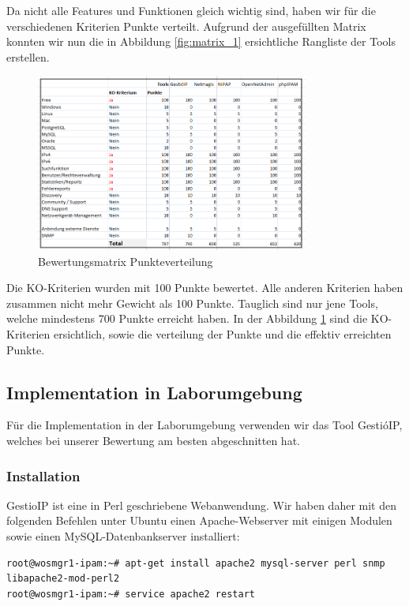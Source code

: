 \documentclass[11pt,a4paper,parskip=half]{scrartcl}
\begin{document}
Da nicht alle Features und Funktionen gleich wichtig sind, haben wir für die verschiedenen Kriterien Punkte verteilt. Aufgrund der ausgefüllten Matrix konnten wir nun die in Abbildung \ref{fig:matrix_1} ersichtliche Rangliste der Tools erstellen.
\begin{figure}[H]
\centering
\includegraphics[width=0.8\textwidth]{Phase3/Matrix_2.png}
\caption{Bewertungsmatrix Punkteverteilung}
\label{fig:matrix_2}
\end{figure}

Die KO-Kriterien wurden mit 100 Punkte bewertet. Alle anderen Kriterien haben zusammen nicht mehr Gewicht als 100 Punkte. Tauglich sind nur jene Tools, welche mindestens 700 Punkte erreicht haben. In der Abbildung  \ref{fig:matrix_2} sind die KO-Kriterien ersichtlich, sowie die verteilung der Punkte und die effektiv erreichten Punkte.
\subsection{Implementation in Laborumgebung}
Für die Implementation in der Laborumgebung verwenden wir das Tool GestióIP, welches bei unserer Bewertung am besten abgeschnitten hat.

\subsubsection{Installation}
GestioIP ist eine in Perl geschriebene Webanwendung. Wir haben daher mit den folgenden Befehlen unter Ubuntu einen Apache-Webserver mit einigen Modulen sowie einen MySQL-Datenbankserver installiert:

\begin{lstlisting}
root@wosmgr1-ipam:~# apt-get install apache2 mysql-server perl snmp libapache2-mod-perl2
root@wosmgr1-ipam:~# service apache2 restart
\end{lstlisting}
\end{document}
